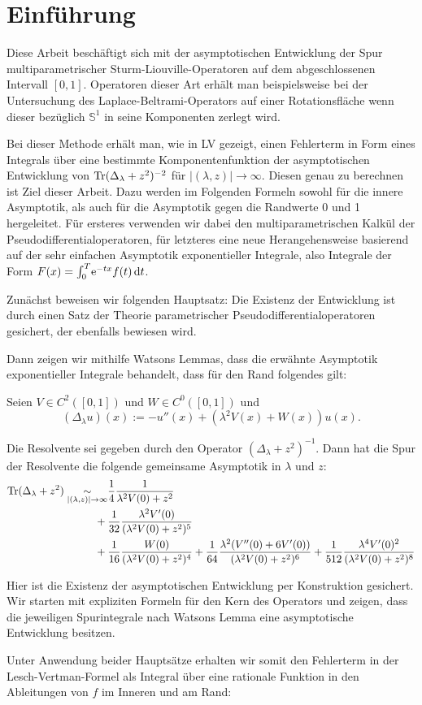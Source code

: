 \section{Einführung}
Diese Arbeit beschäftigt sich mit der asymptotischen Entwicklung der Spur
multiparametrischer Sturm-Liouville-Operatoren auf dem abgeschlossenen Intervall
$[0,1]$. Operatoren dieser Art erhält man beispielsweise bei der Untersuchung
des Laplace-Beltrami-Operators auf einer Rotationsfläche wenn dieser bezüglich
$\mathbb{S}^1$ in seine Komponenten zerlegt wird.


Bei dieser Methode erhält man, wie in LV gezeigt, einen Fehlerterm in Form eines
Integrals über eine bestimmte Komponentenfunktion der asymptotischen Entwicklung
von $\Tr(\Delta_\lambda + z^2)^{-2}$ für $\left|(\lambda, z)\right|\to\infty$.
Diesen genau zu berechnen ist Ziel dieser Arbeit. Dazu werden im Folgenden
Formeln sowohl für die innere Asymptotik, als auch für die Asymptotik gegen die
Randwerte 0 und 1 hergeleitet. Für ersteres verwenden wir dabei den
multiparametrischen Kalkül der Pseudodifferentialoperatoren, für letzteres eine
neue Herangehensweise basierend auf der sehr einfachen Asymptotik exponentieller
Integrale, also Integrale der Form $F(x) = \Integ[T]{0}{t}{\Eto{-tx}f(t)}$.

Zunächst beweisen wir folgenden Hauptsatz:
Die Existenz der Entwicklung ist durch einen Satz der Theorie parametrischer
Pseudodifferentialoperatoren gesichert, der ebenfalls bewiesen wird.

Dann zeigen wir mithilfe Watsons Lemmas, dass die erwähnte Asymptotik
exponentieller Integrale behandelt, dass für den Rand folgendes gilt:
\begin{Hauptsatz}
  Seien $V\in C^2([0,1])$ und $W\in C^0([0,1])$ und
  \begin{equation*}
    (\Delta_\lambda u)(x) := -u''(x) + (\lambda^2 V(x) + W(x)) u(x).
  \end{equation*}

  Die Resolvente sei gegeben durch den Operator $(\Delta_\lambda + z^2)^{-1}$.
  Dann hat die Spur der Resolvente die folgende gemeinsame Asymptotik in
  $\lambda$ und $z$:
  \begin{align*}
    \Tr(\Delta_\lambda + z^2) \SimAs{\Abs{(\lambda, z)}\to\infty}
    &\frac{1}{4} \frac1{\lambda^2 V(0) + z^2} \\
    {}+{}&\frac{1}{32} \frac{\lambda^2 V'(0)}{(\lambda^2 V(0) + z^2)^5} \\
    {}+{}&\frac{1}{16} \frac{W(0)}{(\lambda^2 V(0) + z^2)^4}
    + \frac{1}{64} \frac{\lambda^2 (V''(0) + 6V'(0))}{(\lambda^2 V(0) + z^2)^6}
    + \frac{1}{512} \frac{\lambda^4 V'(0)^2}{(\lambda^2 V(0) + z^2)^8}
  \end{align*}
\end{Hauptsatz}
Hier ist die Existenz der asymptotischen Entwicklung per Konstruktion gesichert.
Wir starten mit expliziten Formeln für den Kern des Operators und zeigen, dass
die jeweiligen Spurintegrale nach Watsons Lemma eine asymptotische Entwicklung
besitzen.

Unter Anwendung beider Hauptsätze erhalten wir somit den Fehlerterm in der
Lesch-Vertman-Formel als Integral über eine rationale Funktion in den
Ableitungen von $f$ im Inneren und am Rand:

